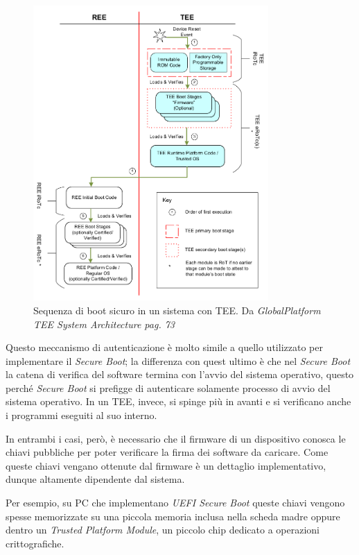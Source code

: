 \documentclass[12pt,italian]{report}
\begin{document}
\begin{figure}
\centering
\includegraphics[width=0.8\textwidth]{immagini/tee-boot-sequence}
\caption{
    Sequenza di boot sicuro in un sistema con TEE. 
    Da \textit{GlobalPlatform TEE System Architecture pag. 73}
    \cite{2020gpsystemarchitecture}
}
\end{figure}

Questo meccanismo di autenticazione è molto simile a quello utilizzato per
implementare il \textit{Secure Boot}; la differenza con quest ultimo è che
nel \textit{Secure Boot} la catena di verifica del software termina con
l'avvio del sistema operativo, questo perché \textit{Secure Boot} si prefigge
di autenticare solamente processo di avvio del sistema operativo.
In un TEE, invece, si spinge più in avanti e si verificano anche i programmi
eseguiti al suo interno.

In entrambi i casi, però, è necessario che il firmware di un dispositivo
conosca le chiavi pubbliche per poter verificare la firma dei software
da caricare. Come queste chiavi vengano ottenute dal firmware è un dettaglio
implementativo, dunque altamente dipendente dal sistema.

Per esempio, su PC che implementano \textit{UEFI Secure Boot} queste chiavi
vengono spesse memorizzate su una piccola memoria inclusa nella scheda madre %
oppure dentro un \textit{Trusted Platform Module}, %
un piccolo chip dedicato a operazioni crittografiche.
\end{document}
